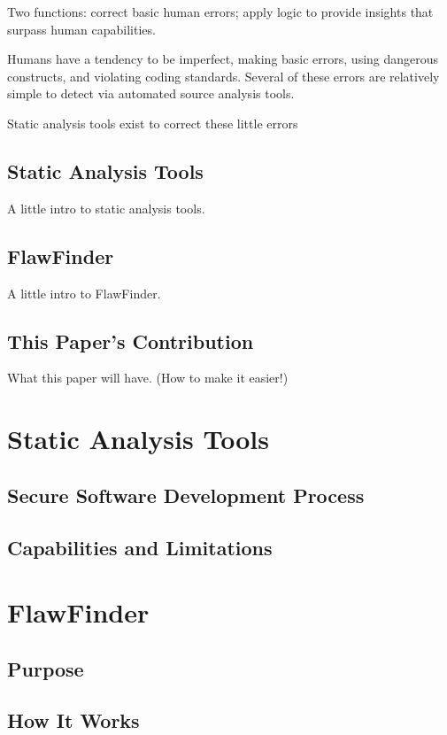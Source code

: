 \documentclass[journal]{IEEEtran}
\begin{document}
Two functions: correct basic human errors; apply logic to provide insights that surpass human
capabilities.

Humans have a tendency to be imperfect, making basic errors, using dangerous constructs, and
violating coding standards. Several of these errors are relatively simple to detect via automated
source analysis tools.

Static analysis tools exist to correct these little errors

\subsection{Static Analysis Tools}
A little intro to static analysis tools.

\subsection{FlawFinder}
A little intro to FlawFinder.

\subsection{This Paper's Contribution}
What this paper will have. (How to make it easier!)


\section{Static Analysis Tools}

\subsection{Secure Software Development Process}

\subsection{Capabilities and Limitations}


\section{FlawFinder}

\subsection{Purpose}

\subsection{How It Works}
\end{document}
